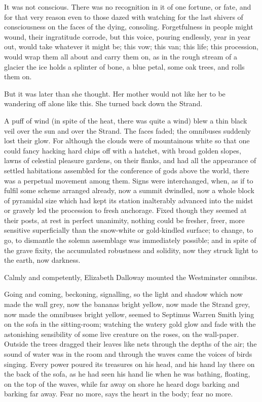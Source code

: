 \documentclass[lang=cn,10pt]{elegantbook}
\begin{document}
It was not conscious.  There was no recognition in it of one
fortune, or fate, and for that very reason even to those dazed with
watching for the last shivers of consciousness on the faces of the
dying, consoling.  Forgetfulness in people might wound, their
ingratitude corrode, but this voice, pouring endlessly, year in
year out, would take whatever it might be; this vow; this van; this
life; this procession, would wrap them all about and carry them on,
as in the rough stream of a glacier the ice holds a splinter of
bone, a blue petal, some oak trees, and rolls them on.

But it was later than she thought.  Her mother would not like her
to be wandering off alone like this.  She turned back down the
Strand.

A puff of wind (in spite of the heat, there was quite a wind) blew
a thin black veil over the sun and over the Strand.  The faces
faded; the omnibuses suddenly lost their glow.  For although the
clouds were of mountainous white so that one could fancy hacking
hard chips off with a hatchet, with broad golden slopes, lawns of
celestial pleasure gardens, on their flanks, and had all the
appearance of settled habitations assembled for the conference of
gods above the world, there was a perpetual movement among them.
Signs were interchanged, when, as if to fulfil some scheme arranged
already, now a summit dwindled, now a whole block of pyramidal size
which had kept its station inalterably advanced into the midst or
gravely led the procession to fresh anchorage.  Fixed though they
seemed at their posts, at rest in perfect unanimity, nothing could
be fresher, freer, more sensitive superficially than the snow-white
or gold-kindled surface; to change, to go, to dismantle the solemn
assemblage was immediately possible; and in spite of the grave
fixity, the accumulated robustness and solidity, now they struck
light to the earth, now darkness.

Calmly and competently, Elizabeth Dalloway mounted the Westminster
omnibus.

Going and coming, beckoning, signalling, so the light and shadow
which now made the wall grey, now the bananas bright yellow, now
made the Strand grey, now made the omnibuses bright yellow, seemed
to Septimus Warren Smith lying on the sofa in the sitting-room;
watching the watery gold glow and fade with the astonishing
sensibility of some live creature on the roses, on the wall-paper.
Outside the trees dragged their leaves like nets through the depths
of the air; the sound of water was in the room and through the
waves came the voices of birds singing.  Every power poured its
treasures on his head, and his hand lay there on the back of the
sofa, as he had seen his hand lie when he was bathing, floating, on
the top of the waves, while far away on shore he heard dogs barking
and barking far away.  Fear no more, says the heart in the body;
fear no more.
\end{document}
